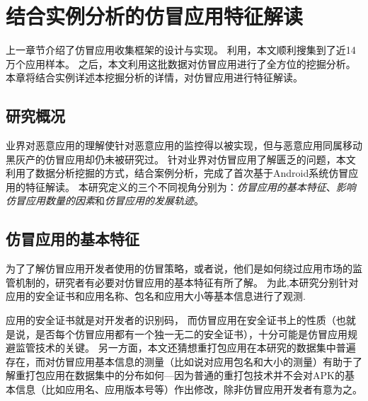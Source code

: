 \chapter{结合实例分析的仿冒应用特征解读}
\label{chp:discoveries}

上一章节介绍了仿冒应用收集框架\mytool 的设计与实现。
利用\mytool，本文顺利搜集到了近14万个应用样本。
之后，本文利用这批数据对仿冒应用进行了全方位的挖掘分析。
本章将结合实例详述本挖掘分析的详情，对仿冒应用进行特征解读。

\section{研究概况}
业界对恶意应用的理解使针对恶意应用的监控得以被实现，但与恶意应用同属移动黑灰产的仿冒应用却仍未被研究过。
针对业界对仿冒应用了解匮乏的问题，本文利用了数据分析挖掘的方式，结合案例分析，完成了首次基于Android系统仿冒应用的特征解读。
本研究定义的三个不同视角分别为：\emph{仿冒应用的基本特征}、\emph{影响仿冒应用数量的因素}和\emph{仿冒应用的发展轨迹}。

\section{仿冒应用的基本特征}
\label{sec:fakeCharacteristics}
为了了解仿冒应用开发者使用的仿冒策略，或者说，他们是如何绕过应用市场的监管机制的，研究者有必要对仿冒应用的基本特征有所了解。
为此,本研究分别针对应用的安全证书和应用名称、包名和应用大小等基本信息进行了观测.

应用的安全证书就是对开发者的识别码，
而仿冒应用在安全证书上的性质（也就是说，是否每个仿冒应用都有一个独一无二的安全证书），十分可能是仿冒应用规避监管技术的关键。
另一方面，本文还猜想重打包应用在本研究的数据集中普遍存在，而对仿冒应用基本信息的测量（比如说对应用包名和大小的测量）有助于了解重打包应用在数据集中的分布如何---因为普通的重打包技术并不会对APK的基本信息（比如应用名、应用版本号等）作出修改，除非仿冒应用开发者有意为之。

